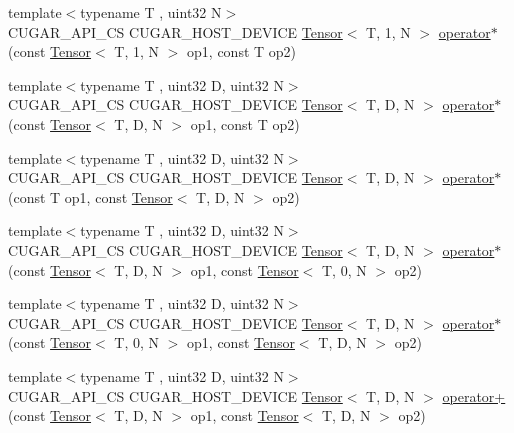 \begin{DoxyCompactItemize}
\item 
{\footnotesize template$<$typename T , uint32 N$>$ }\\C\+U\+G\+A\+R\+\_\+\+A\+P\+I\+\_\+\+CS C\+U\+G\+A\+R\+\_\+\+H\+O\+S\+T\+\_\+\+D\+E\+V\+I\+CE \hyperlink{structcugar_1_1_tensor}{Tensor}$<$ T, 1, N $>$ \hyperlink{namespacecugar_a269c60a8983b2a19b12b055ec1d3ce53}{operator$\ast$} (const \hyperlink{structcugar_1_1_tensor}{Tensor}$<$ T, 1, N $>$ op1, const T op2)
\item 
{\footnotesize template$<$typename T , uint32 D, uint32 N$>$ }\\C\+U\+G\+A\+R\+\_\+\+A\+P\+I\+\_\+\+CS C\+U\+G\+A\+R\+\_\+\+H\+O\+S\+T\+\_\+\+D\+E\+V\+I\+CE \hyperlink{structcugar_1_1_tensor}{Tensor}$<$ T, D, N $>$ \hyperlink{namespacecugar_a948fa225b6b9d9c9fe4c8e292ae89b27}{operator$\ast$} (const \hyperlink{structcugar_1_1_tensor}{Tensor}$<$ T, D, N $>$ op1, const T op2)
\item 
{\footnotesize template$<$typename T , uint32 D, uint32 N$>$ }\\C\+U\+G\+A\+R\+\_\+\+A\+P\+I\+\_\+\+CS C\+U\+G\+A\+R\+\_\+\+H\+O\+S\+T\+\_\+\+D\+E\+V\+I\+CE \hyperlink{structcugar_1_1_tensor}{Tensor}$<$ T, D, N $>$ \hyperlink{namespacecugar_a9127e90e4c449bd8c893feef996e5a97}{operator$\ast$} (const T op1, const \hyperlink{structcugar_1_1_tensor}{Tensor}$<$ T, D, N $>$ op2)
\item 
{\footnotesize template$<$typename T , uint32 D, uint32 N$>$ }\\C\+U\+G\+A\+R\+\_\+\+A\+P\+I\+\_\+\+CS C\+U\+G\+A\+R\+\_\+\+H\+O\+S\+T\+\_\+\+D\+E\+V\+I\+CE \hyperlink{structcugar_1_1_tensor}{Tensor}$<$ T, D, N $>$ \hyperlink{namespacecugar_ae8c09c99638658fa703697fba1fca018}{operator$\ast$} (const \hyperlink{structcugar_1_1_tensor}{Tensor}$<$ T, D, N $>$ op1, const \hyperlink{structcugar_1_1_tensor}{Tensor}$<$ T, 0, N $>$ op2)
\item 
{\footnotesize template$<$typename T , uint32 D, uint32 N$>$ }\\C\+U\+G\+A\+R\+\_\+\+A\+P\+I\+\_\+\+CS C\+U\+G\+A\+R\+\_\+\+H\+O\+S\+T\+\_\+\+D\+E\+V\+I\+CE \hyperlink{structcugar_1_1_tensor}{Tensor}$<$ T, D, N $>$ \hyperlink{namespacecugar_aff946519c06f0697d939f1b64ff2e9c3}{operator$\ast$} (const \hyperlink{structcugar_1_1_tensor}{Tensor}$<$ T, 0, N $>$ op1, const \hyperlink{structcugar_1_1_tensor}{Tensor}$<$ T, D, N $>$ op2)
\item 
{\footnotesize template$<$typename T , uint32 D, uint32 N$>$ }\\C\+U\+G\+A\+R\+\_\+\+A\+P\+I\+\_\+\+CS C\+U\+G\+A\+R\+\_\+\+H\+O\+S\+T\+\_\+\+D\+E\+V\+I\+CE \hyperlink{structcugar_1_1_tensor}{Tensor}$<$ T, D, N $>$ \hyperlink{namespacecugar_ad00d874cefcf34cd39c694ae936cf052}{operator+} (const \hyperlink{structcugar_1_1_tensor}{Tensor}$<$ T, D, N $>$ op1, const \hyperlink{structcugar_1_1_tensor}{Tensor}$<$ T, D, N $>$ op2)

\end{DoxyCompactItemize}
